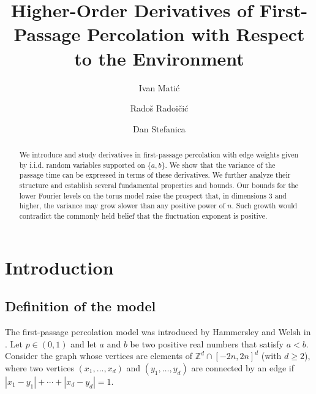 \documentclass[reqno]{amsart}
\begin{document}
 
 

\title[Higher-Order Derivatives of First-Passage Percolation]{Higher-Order Derivatives of First-Passage Percolation with Respect to the Environment} 

\author[I. Mati\'c]{
Ivan Mati\'c}
\address{
Baruch College, City University of New York}
\author[R. Radoi\v ci\'c]{
Rado\v s Radoi\v ci\'c} \address{
Baruch College, City University of New York} 
\author[D. Stefanica]{
Dan Stefanica}\address{
Baruch College, City University of New York}



 

\begin{abstract}
We introduce and study derivatives in first-passage percolation with edge weights given by i.i.d. random variables supported on $\{a,b\}$. 
We show that the variance of the passage time can be expressed in terms of these derivatives. We further analyze their structure and establish several 
fundamental properties and bounds. Our bounds for the lower Fourier levels on the torus model raise the prospect that, in dimensions 3 and higher, the variance may grow slower than any positive power of $n$. Such growth would contradict the commonly held belief that the fluctuation exponent is positive. \end{abstract}


\maketitle






\section{Introduction}


\subsection{Definition of the model}
\noindent The first-passage percolation model was introduced by Hammersley and Welsh in \cite{HammersleyWelsh1965}. Let $p\in (0,1)$ and let $a$ and $b$ be two positive real numbers that satisfy $a<b$. 
Consider the graph whose vertices are elements of $\mathbb Z^d\cap [-2n,2n]^d$ (with $d\geq 2$), where two vertices $(x_1, \dots, x_d)$ and $(y_1,\dots, y_d)$ are connected by an edge if $|x_1-y_1|+\cdots+|x_d-y_d|=1$. 
\end{document}
